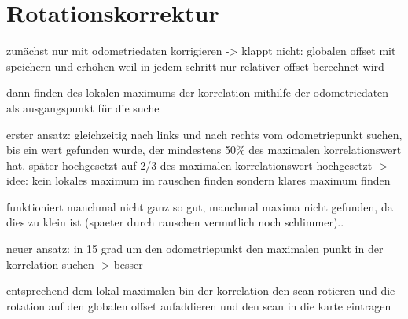 \section{Rotationskorrektur}

zunächst nur mit odometriedaten korrigieren -> klappt nicht: globalen offset mit speichern und erhöhen weil in jedem schritt nur relativer offset berechnet wird

dann finden des lokalen maximums der korrelation mithilfe der odometriedaten als ausgangspunkt für die suche

erster ansatz: gleichzeitig nach links und nach rechts vom odometriepunkt suchen, bis ein wert gefunden wurde, der mindestens 50\% des maximalen korrelationswert hat. später hochgesetzt auf 2/3 des maximalen korrelationswert hochgesetzt -> idee: kein lokales maximum im rauschen finden sondern klares maximum finden

funktioniert manchmal nicht ganz so gut, manchmal maxima nicht gefunden, da dies zu klein ist (spaeter durch rauschen vermutlich noch schlimmer)..

neuer ansatz: in 15 grad um den odometriepunkt den maximalen punkt in der korrelation suchen -> besser

entsprechend dem lokal maximalen bin der korrelation den scan rotieren und die rotation auf den globalen offset aufaddieren und den scan in die karte eintragen